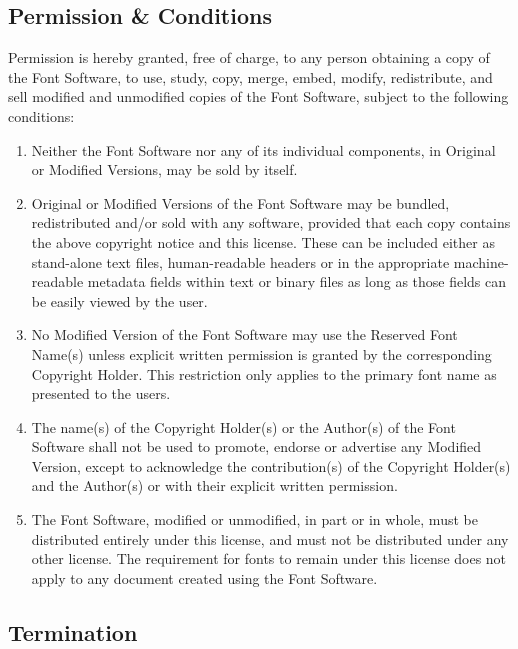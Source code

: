 \subsection*{Permission \& Conditions}
\label{sil:permission}

Permission is hereby granted, free of charge, to any person
obtaining a copy of the Font Software, to use, study, copy,
merge, embed, modify, redistribute, and sell modified and
unmodified copies of the Font Software, subject to the
following conditions:

\begin{enumerate}
\item Neither the Font Software nor any of its individual
components, in Original or Modified Versions, may be sold by
itself.

\item Original or Modified Versions of the Font Software may
be bundled, redistributed and/or sold with any software,
provided that each copy contains the above copyright notice
and this license. These can be included either as
stand-alone text files, human-readable headers or in the
appropriate machine-readable metadata fields within text or
binary files as long as those fields can be easily viewed by
the user.

\item No Modified Version of the Font Software may use the
Reserved Font Name(s) unless explicit written permission is
granted by the corresponding Copyright Holder. This
restriction only applies to the primary font name as
presented to the users.

\item The name(s) of the Copyright Holder(s) or the
Author(s) of the Font Software shall not be used to promote,
endorse or advertise any Modified Version, except to
acknowledge the contribution(s) of the Copyright Holder(s)
and the Author(s) or with their explicit written permission.

\item The Font Software, modified or unmodified, in part or
in whole, must be distributed entirely under this license,
and must not be distributed under any other license. The
requirement for fonts to remain under this license does not
apply to any document created using the Font Software.
\end{enumerate}

\subsection*{Termination}
\label{sil:termination}

